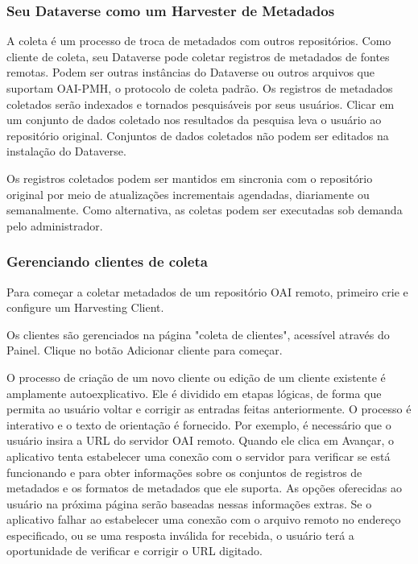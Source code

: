\documentclass[12pt,hidelinks]{article}
\begin{document}
\subsubsection{Seu Dataverse como um Harvester de Metadados}

\qquad A coleta é um processo de troca de metadados com outros repositórios. Como cliente de coleta, seu Dataverse pode coletar registros de metadados de fontes remotas. Podem ser outras instâncias do Dataverse ou outros arquivos que suportam OAI-PMH, o protocolo de coleta padrão. Os registros de metadados coletados serão indexados e tornados pesquisáveis por seus usuários. Clicar em um conjunto de dados coletado nos resultados da pesquisa leva o usuário ao repositório original. Conjuntos de dados coletados não podem ser editados na instalação do Dataverse.
 
Os registros coletados podem ser mantidos em sincronia com o repositório original por meio de atualizações incrementais agendadas, diariamente ou semanalmente. Como alternativa, as coletas podem ser executadas sob demanda pelo administrador.
 
\subsubsection{Gerenciando clientes de coleta}

\qquad Para começar a coletar metadados de um repositório OAI remoto, primeiro crie e configure um Harvesting Client.
 
Os clientes são gerenciados na página "coleta de clientes", acessível através do Painel. Clique no botão Adicionar cliente para começar.
 
O processo de criação de um novo cliente ou edição de um cliente existente é amplamente autoexplicativo. Ele é dividido em etapas lógicas, de forma que permita ao usuário voltar e corrigir as entradas feitas anteriormente. O processo é interativo e o texto de orientação é fornecido. Por exemplo, é necessário que o usuário insira a URL do servidor OAI remoto. Quando ele clica em Avançar, o aplicativo tenta estabelecer uma conexão com o servidor para verificar se está funcionando e para obter informações sobre os conjuntos de registros de metadados e os formatos de metadados que ele suporta. As opções oferecidas ao usuário na próxima página serão baseadas nessas informações extras. Se o aplicativo falhar ao estabelecer uma conexão com o arquivo remoto no endereço especificado, ou se uma resposta inválida for recebida, o usuário terá a oportunidade de verificar e corrigir o URL digitado.
 
\end{document}
